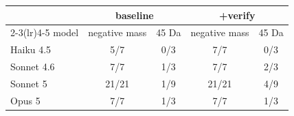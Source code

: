\begin{tabular}{lcccc}
\toprule
 & \multicolumn{2}{c}{baseline} & \multicolumn{2}{c}{+verify} \\
\cmidrule(lr){2-3}\cmidrule(lr){4-5}
model & negative mass & 45 Da & negative mass & 45 Da \\
\midrule
Haiku 4.5 & 5/7 & 0/3 & 7/7 & 0/3 \\
Sonnet 4.6 & 7/7 & 1/3 & 7/7 & 2/3 \\
Sonnet 5 & 21/21 & 1/9 & 21/21 & 4/9 \\
Opus 5 & 7/7 & 1/3 & 7/7 & 1/3 \\
\bottomrule
\end{tabular}
